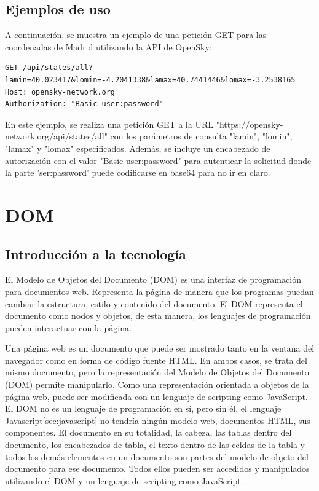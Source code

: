 \documentclass[a4paper, 11pt]{book}
\begin{document}
\subsection{Ejemplos de uso}
A continuación, se muestra un ejemplo de una petición GET para las coordenadas de Madrid utilizando la API de OpenSky:
\begin{verbatim}
GET /api/states/all?lamin=40.023417&lomin=-4.2041338&lamax=40.7441446&lomax=-3.2538165
Host: opensky-network.org
Authorization: "Basic user:password"
\end{verbatim}

En este ejemplo, se realiza una petición GET a la URL "https://opensky-network.org/api/states/all" con los parámetros de consulta "lamin", "lomin", "lamax" y "lomax" especificados. Además, se incluye un encabezado de autorización con el valor "Basic user:password" para autenticar la solicitud donde la parte 'ser:password' puede codificarse en base64 para no ir en claro.



\section{DOM}
\label{sec:dom}
\subsection{Introducción a la tecnología}
El Modelo de Objetos del Documento (DOM) es una interfaz de programación para documentos web. Representa la página de manera que los programas puedan cambiar la estructura, estilo y contenido del documento. El DOM representa el documento como nodos y objetos, de esta manera, los lenguajes de programación pueden interactuar con la página.

Una página web es un documento que puede ser mostrado tanto en la ventana del navegador como en forma de código fuente HTML. En ambos casos, se trata del mismo documento, pero la representación del Modelo de Objetos del Documento (DOM) permite manipularlo. Como una representación orientada a objetos de la página web, puede ser modificada con un lenguaje de scripting como JavaScript.
El DOM no es un lenguaje de programación en sí, pero sin él, el lenguaje Javascript\ref{sec:javascript} no tendría ningún modelo web, documentos HTML, sus componentes. El documento en su totalidad, la cabeza, las tablas dentro del documento, los encabezados de tabla, el texto dentro de las celdas de la tabla y todos los demás elementos en un documento son partes del modelo de objeto del documento para ese documento. Todos ellos pueden ser accedidos y manipulados utilizando el DOM y un lenguaje de scripting como JavaScript.
\end{document}
